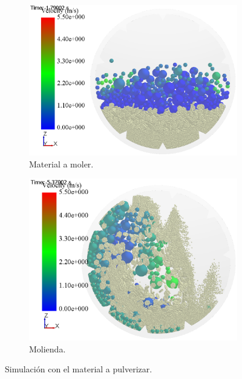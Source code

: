 \begin{figure}[h!]
	\centering
	\begin{subfigure}[b]{0.6\textwidth}
		\centering
		\includegraphics[width=\textwidth]{Images/Resultados/Real.PNG}
		\caption{Material a moler.}
	\end{subfigure}
	\hfill
	\begin{subfigure}[b]{0.6\textwidth}
		\centering
		\includegraphics[width=\textwidth]{Images/Resultados/total.PNG}
	\caption{Molienda.}
	\end{subfigure}
	\caption{Simulaci\'on con el material a pulverizar.}
	\label{resul4}
\end{figure}


